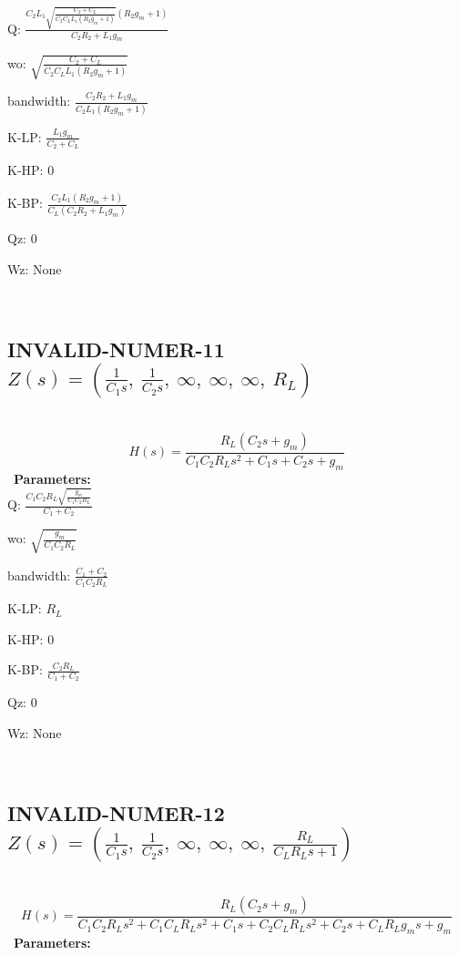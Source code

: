 \documentclass{article}
\begin{document}
Q: $\frac{C_{2} L_{1} \sqrt{\frac{C_{2} + C_{L}}{C_{2} C_{L} L_{1} \left(R_{2} g_{m} + 1\right)}} \left(R_{2} g_{m} + 1\right)}{C_{2} R_{2} + L_{1} g_{m}}$\ 

wo: $\sqrt{\frac{C_{2} + C_{L}}{C_{2} C_{L} L_{1} \left(R_{2} g_{m} + 1\right)}}$\ 

bandwidth: $\frac{C_{2} R_{2} + L_{1} g_{m}}{C_{2} L_{1} \left(R_{2} g_{m} + 1\right)}$\ 

K-LP: $\frac{L_{1} g_{m}}{C_{2} + C_{L}}$\ 

K-HP: $0$\ 

K-BP: $\frac{C_{2} L_{1} \left(R_{2} g_{m} + 1\right)}{C_{L} \left(C_{2} R_{2} + L_{1} g_{m}\right)}$\ 

Qz: $0$\ 

Wz: $\text{None}$\ 

\ 

\subsection{INVALID-NUMER-11 $Z(s) = \left( \frac{1}{C_{1} s}, \  \frac{1}{C_{2} s}, \  \infty, \  \infty, \  \infty, \  R_{L}\right)$ } \ 
\textbf{\[H(s) = \frac{R_{L} \left(C_{2} s + g_{m}\right)}{C_{1} C_{2} R_{L} s^{2} + C_{1} s + C_{2} s + g_{m}}\] } \ 
\textbf{Parameters:}\\ 

Q: $\frac{C_{1} C_{2} R_{L} \sqrt{\frac{g_{m}}{C_{1} C_{2} R_{L}}}}{C_{1} + C_{2}}$\ 

wo: $\sqrt{\frac{g_{m}}{C_{1} C_{2} R_{L}}}$\ 

bandwidth: $\frac{C_{1} + C_{2}}{C_{1} C_{2} R_{L}}$\ 

K-LP: $R_{L}$\ 

K-HP: $0$\ 

K-BP: $\frac{C_{2} R_{L}}{C_{1} + C_{2}}$\ 

Qz: $0$\ 

Wz: $\text{None}$\ 

\ 

\subsection{INVALID-NUMER-12 $Z(s) = \left( \frac{1}{C_{1} s}, \  \frac{1}{C_{2} s}, \  \infty, \  \infty, \  \infty, \  \frac{R_{L}}{C_{L} R_{L} s + 1}\right)$ } \ 
\textbf{\[H(s) = \frac{R_{L} \left(C_{2} s + g_{m}\right)}{C_{1} C_{2} R_{L} s^{2} + C_{1} C_{L} R_{L} s^{2} + C_{1} s + C_{2} C_{L} R_{L} s^{2} + C_{2} s + C_{L} R_{L} g_{m} s + g_{m}}\] } \ 
\textbf{Parameters:}\\ 
\end{document}
